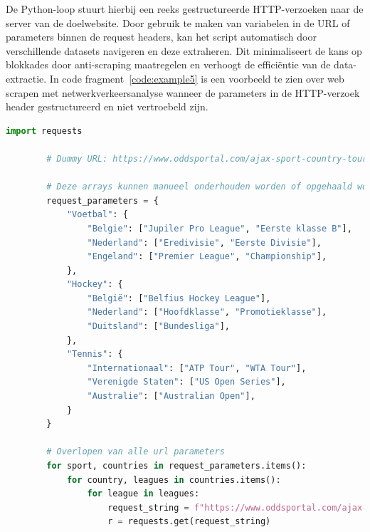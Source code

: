 De Python-loop stuurt hierbij een reeks gestructureerde HTTP-verzoeken naar de server van de doelwebsite. Door gebruik te maken van variabelen in de URL of parameters binnen de request headers, kan het script automatisch door verschillende datasets navigeren en deze extraheren. Dit minimaliseert de kans op blokkades door anti-scraping maatregelen en verhoogt de efficiëntie van de data-extractie. In code fragment~\ref{code:example5} is een voorbeeld te zien over web scrapen met netwerkverkeersanalyse wanneer de parameters in de HTTP-verzoek header gestructureerd en niet vertroebeld zijn.
\begin{listing}
    \begin{lstlisting}[language=python, captionpos=b, caption={Een voorbeeld van een eenvoudige webscraper.}, label={code:example5}]
        import requests

        # Dummy URL: https://www.oddsportal.com/ajax-sport-country-tournament/sport/country/league/

        # Deze arrays kunnen manueel onderhouden worden of opgehaald worden met een API
        request_parameters = {
            "Voetbal": {
                "Belgie": ["Jupiler Pro League", "Eerste klasse B"],
                "Nederland": ["Eredivisie", "Eerste Divisie"],
                "Engeland": ["Premier League", "Championship"],
            },
            "Hockey": {
                "België": ["Belfius Hockey League"],
                "Nederland": ["Hoofdklasse", "Promotieklasse"],
                "Duitsland": ["Bundesliga"],
            },
            "Tennis": {
                "Internationaal": ["ATP Tour", "WTA Tour"],
                "Verenigde Staten": ["US Open Series"],
                "Australie": ["Australian Open"],
            }
        }

        # Overlopen van alle url parameters
        for sport, countries in request_parameters.items():
            for country, leagues in countries.items():
                for league in leagues:
                    request_string = f"https://www.oddsportal.com/ajax-sport-country-tournament/{sport}/{country}/{league}/"
                    r = requests.get(request_string)
    \end{lstlisting}
\end{listing}

